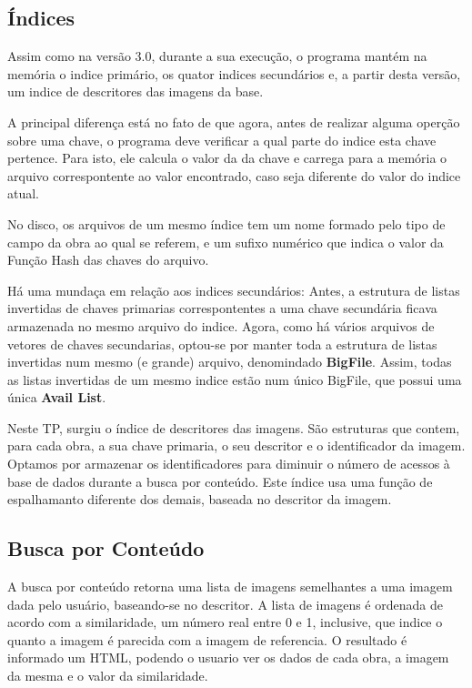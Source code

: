 \subsection{Índices}
Assim como na versão 3.0, durante a sua execução, o programa mantém na memória
o indice primário, os quator indices secundários e, a partir desta versão, um
indice de descritores das imagens da base.

A principal diferença está no fato de que agora, antes de realizar alguma
operção sobre uma chave, o programa deve verificar a qual parte do indice esta
chave pertence. Para isto, ele calcula o valor da  da chave
e carrega para a memória o arquivo correspontente ao valor encontrado, caso seja
diferente do valor do indice atual.

No disco, os arquivos de um mesmo índice tem um nome formado pelo tipo de campo
da obra ao qual se referem, e um sufixo numérico que indica o valor da Função
Hash das chaves do arquivo.

Há uma mundaça em relação aos indices secundários: Antes, a estrutura de listas
invertidas de chaves primarias correspontentes a uma chave secundária ficava
armazenada no mesmo arquivo do indice. Agora, como há vários arquivos de
vetores de chaves secundarias, optou-se por manter toda a estrutura de listas
invertidas num mesmo (e grande) arquivo, denomindado \textbf{BigFile}. Assim,
todas as listas invertidas de um mesmo indice estão num único BigFile, que possui uma
única \textbf{Avail List}.

Neste TP, surgiu o índice de descritores das imagens. São estruturas que
contem, para cada obra, a sua chave primaria, o seu descritor e o identificador
da imagem. Optamos por armazenar os identificadores para diminuir o número de
acessos à base de dados durante a \textsf{busca por conteúdo}. Este índice usa
uma função de espalhamanto diferente dos demais, baseada no descritor da imagem.

\subsection{Busca por Conteúdo}
A busca por conteúdo retorna uma lista de imagens semelhantes a uma imagem dada
pelo usuário, baseando-se no descritor. A lista de imagens é ordenada de acordo
com a similaridade, um número real entre 0 e 1, inclusive, que indice o quanto
a imagem é parecida com a imagem de referencia. O resultado é informado um
HTML, podendo o usuario ver os dados de cada obra, a imagem da mesma e o valor
da similaridade.

